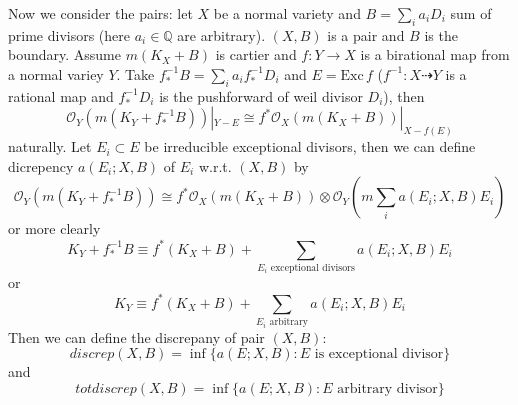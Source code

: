 \documentclass{article}
\begin{document}
Now we consider the pairs: let $ X $ be a normal variety and $ B=\sum_ia_iD_i $ sum of prime divisors (here $ a_i\in \mathbb{Q} $ are arbitrary). $ (X,B) $ is a pair and $ B $ is the boundary. Assume $ m(K_X+B) $ is cartier and $ f:Y\to X $ is a birational map from a normal variey $ Y $. Take $ f^{-1}_*B=\sum_ia_if^{-1}_*D_i $ and $ E=\mathrm{Exc}\,f $ ($ f^{-1}:X\dashrightarrow Y $ is a rational map and $ f^{-1}_*D_i $ is the pushforward of weil divisor $ D_i $), then 
\[ \mathcal{O}_Y(m(K_Y+ f^{-1}_*B))|_{Y-E}\cong f^*\mathcal{O}_X(m(K_X+B))|_{X-f(E)} \]
naturally. Let $ E_i\subset E $ be irreducible exceptional divisors, then we can define dicrepency $ a(E_i;X,B) $ of $ E_i $ w.r.t. $ (X,B) $ by
\[ \mathcal{O}_Y(m(K_Y+ f^{-1}_*B))\cong f^*\mathcal{O}_X(m(K_X+B))\otimes\mathcal{O}_Y(m\sum_ia(E_i;X,B)E_i ) \]
or more clearly
\[ K_Y+f^{-1}_*B\equiv f^*(K_X+B)+\sum_{E_i\text{ exceptional divisors}}a(E_i;X,B)E_i \]
or 
\[ K_Y\equiv f^*(K_X+B)+\sum_{E_i\text{ arbitrary}}a(E_i;X,B)E_i \]
Then we can define the discrepany of pair $ (X,B) $:
\[ discrep(X,B)=\inf \{a(E;X,B):E \text{ is exceptional divisor}\} \]
and
\[ totdiscrep(X,B)=\inf \{a(E;X,B):E \text{ arbitrary divisor}\} \]
\end{document}
